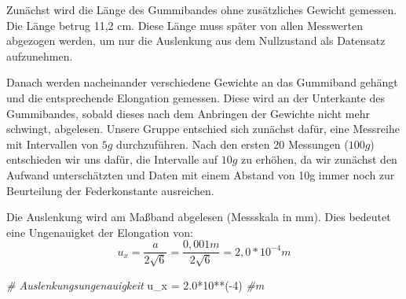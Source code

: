 \documentclass[
]{article}
\newenvironment{Shaded}{\begin{snugshade}}{\end{snugshade}}
\newcommand{\CommentTok}[1]{\textcolor[rgb]{0.56,0.35,0.01}{\textit{#1}}}
\newcommand{\DecValTok}[1]{\textcolor[rgb]{0.00,0.00,0.81}{#1}}
\newcommand{\FloatTok}[1]{\textcolor[rgb]{0.00,0.00,0.81}{#1}}
\newcommand{\FunctionTok}[1]{\textcolor[rgb]{0.00,0.00,0.00}{#1}}
\newcommand{\NormalTok}[1]{#1}
\newcommand{\OtherTok}[1]{\textcolor[rgb]{0.56,0.35,0.01}{#1}}
\newcommand{\SpecialCharTok}[1]{\textcolor[rgb]{0.00,0.00,0.00}{#1}}
\begin{document}
\begin{Shaded}
\end{Shaded}

Zunächst wird die Länge des Gummibandes ohne zusätzliches Gewicht
gemessen. Die Länge betrug 11,2 cm. Diese Länge muss später von allen
Messwerten abgezogen werden, um nur die Auslenkung aus dem Nullzustand
als Datensatz aufzunehmen.

Danach werden nacheinander verschiedene Gewichte an das Gummiband
gehängt und die entsprechende Elongation gemessen. Diese wird an der
Unterkante des Gummibandes, sobald dieses nach dem Anbringen der
Gewichte nicht mehr schwingt, abgelesen. Unsere Gruppe entschied sich
zunächst dafür, eine Messreihe mit Intervallen von \(5g\) durchzuführen.
Nach den ersten 20 Messungen (\(100g\)) entschieden wir uns dafür, die
Intervalle auf \(10g\) zu erhöhen, da wir zunächst den Aufwand
unterschätzten und Daten mit einem Abstand von 10g immer noch zur
Beurteilung der Federkonstante ausreichen.

Die Auslenkung wird am Maßband abgelesen (Messskala in mm). Dies
bedeutet eine Ungenauigket der Elongation von:
\[u_{x}=\frac{a}{2\sqrt{6}}= \frac{0,001m}{2\sqrt{6}}=2,0*10^{-4}m\]

\begin{Shaded}
\begin{Highlighting}[]
\CommentTok{\# Auslenkungsungenauigkeit }
\NormalTok{u\_x }\OtherTok{=} \FloatTok{2.0}\SpecialCharTok{*}\DecValTok{10}\SpecialCharTok{**}\NormalTok{(}\SpecialCharTok{{-}}\DecValTok{4}\NormalTok{) }\CommentTok{\#m}
\end{Highlighting}
\end{Shaded}
\end{document}
